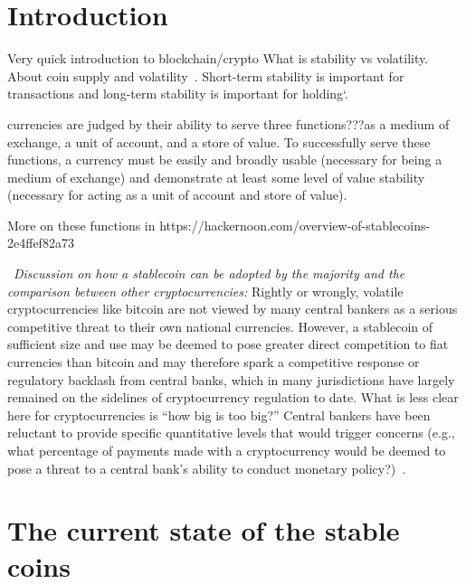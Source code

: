 \section{Introduction}
Very quick introduction to blockchain/crypto
What is stability vs volatility.
About coin supply and volatility~\cite{sams2015note}.
Short-term stability is important for transactions and long-term stability is important for holding`\cite{forbes}.


currencies are judged by their ability to serve three functions???as a medium of exchange, a unit of account, and a store of value. To successfully serve these functions, a currency must be easily and broadly usable (necessary for being a medium of exchange) and demonstrate at least some level of value stability (necessary for acting as a unit of account and store of value).

More on these functions in https://hackernoon.com/overview-of-stablecoins-2e4ffef82a73

~\textit{Discussion on how a stablecoin can be adopted by the majority and the comparison between other cryptocurrencies:}
Rightly or wrongly, volatile cryptocurrencies like bitcoin are not viewed by many central bankers as a serious
competitive threat to their own national currencies. However, a stablecoin of sufficient size and use may
be deemed to pose greater direct competition to fiat currencies than bitcoin and may therefore spark a
competitive response or regulatory backlash from central banks, which in many jurisdictions have largely
remained on the sidelines of cryptocurrency regulation to date. What is less clear here for cryptocurrencies
is “how big is too big?” Central bankers have been reluctant to provide specific quantitative levels that would
trigger concerns (e.g., what percentage of payments made with a cryptocurrency would be deemed to pose
a threat to a central bank’s ability to conduct monetary policy?)~\cite{report}.


\section{The current state of the stable coins} %

